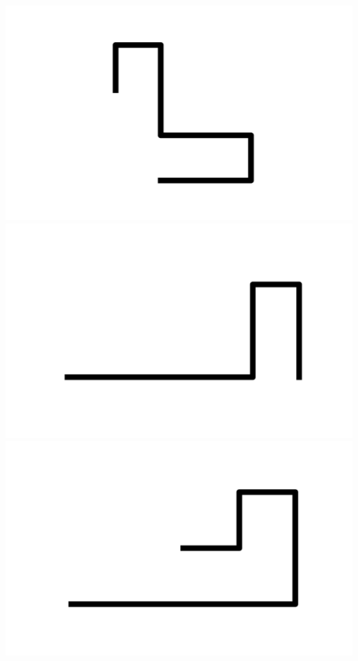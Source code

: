 \documentclass[]{report}
\begin{document}
\includegraphics[scale=.1]{pictures/21/state_cluster_shapes_202.pdf} 
\includegraphics[scale=.1]{pictures/21/state_cluster_shapes_203.pdf} 
\includegraphics[scale=.1]{pictures/21/state_cluster_shapes_204.pdf} 
\end{document}
